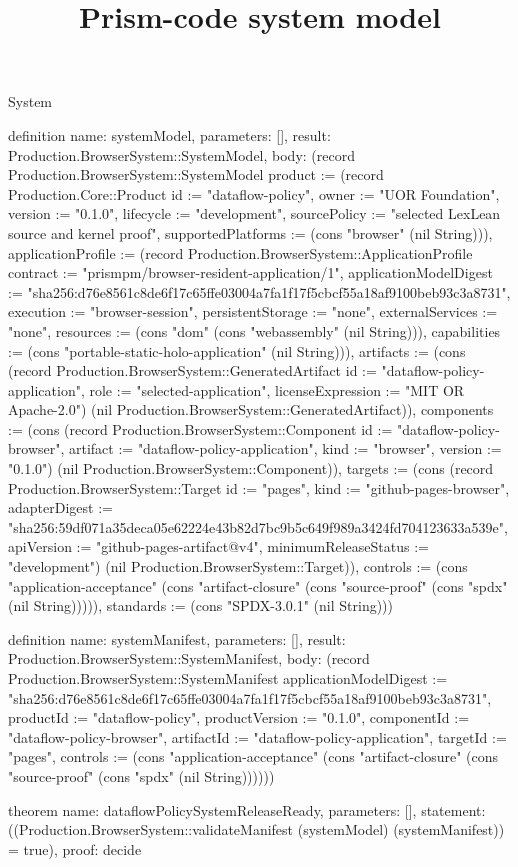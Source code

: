 \begin{lexlean}{System}
\title{Prism-code system model}
\begin{semanticmodule}
definition{
  name: systemModel,
  parameters: [],
  result: Production.BrowserSystem::SystemModel,
  body: (record Production.BrowserSystem::SystemModel {product := (record Production.Core::Product {id := "dataflow-policy", owner := "UOR Foundation", version := "0.1.0", lifecycle := "development", sourcePolicy := "selected LexLean source and kernel proof", supportedPlatforms := (cons "browser" (nil String))}), applicationProfile := (record Production.BrowserSystem::ApplicationProfile {contract := "prismpm/browser-resident-application/1", applicationModelDigest := "sha256:d76e8561c8de6f17c65ffe03004a7fa1f17f5cbcf55a18af9100beb93c3a8731", execution := "browser-session", persistentStorage := "none", externalServices := "none", resources := (cons "dom" (cons "webassembly" (nil String))), capabilities := (cons "portable-static-holo-application" (nil String))}), artifacts := (cons (record Production.BrowserSystem::GeneratedArtifact {id := "dataflow-policy-application", role := "selected-application", licenseExpression := "MIT OR Apache-2.0"}) (nil Production.BrowserSystem::GeneratedArtifact)), components := (cons (record Production.BrowserSystem::Component {id := "dataflow-policy-browser", artifact := "dataflow-policy-application", kind := "browser", version := "0.1.0"}) (nil Production.BrowserSystem::Component)), targets := (cons (record Production.BrowserSystem::Target {id := "pages", kind := "github-pages-browser", adapterDigest := "sha256:59df071a35deca05e62224e43b82d7bc9b5c649f989a3424fd704123633a539e", apiVersion := "github-pages-artifact@v4", minimumReleaseStatus := "development"}) (nil Production.BrowserSystem::Target)), controls := (cons "application-acceptance" (cons "artifact-closure" (cons "source-proof" (cons "spdx" (nil String))))), standards := (cons "SPDX-3.0.1" (nil String))})
}

definition{
  name: systemManifest,
  parameters: [],
  result: Production.BrowserSystem::SystemManifest,
  body: (record Production.BrowserSystem::SystemManifest {applicationModelDigest := "sha256:d76e8561c8de6f17c65ffe03004a7fa1f17f5cbcf55a18af9100beb93c3a8731", productId := "dataflow-policy", productVersion := "0.1.0", componentId := "dataflow-policy-browser", artifactId := "dataflow-policy-application", targetId := "pages", controls := (cons "application-acceptance" (cons "artifact-closure" (cons "source-proof" (cons "spdx" (nil String)))))})
}

theorem{
  name: dataflowPolicySystemReleaseReady,
  parameters: [],
  statement: ((Production.BrowserSystem::validateManifest (systemModel) (systemManifest)) = true),
  proof: decide{}
}
\end{semanticmodule}
\end{lexlean}

